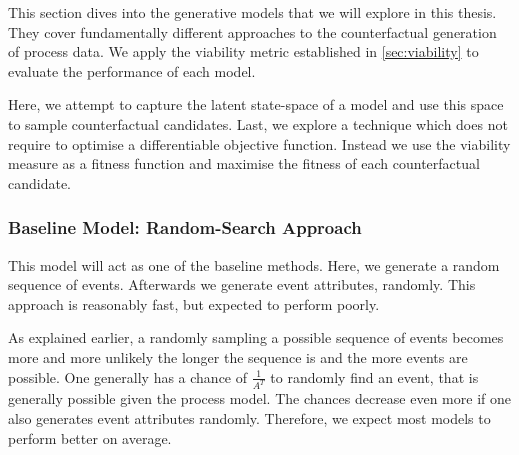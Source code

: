 \documentclass[./../../paper.tex]{subfiles}
\begin{document}
This section dives into the generative models that we will explore in this thesis. They cover fundamentally different approaches to the counterfactual generation of process data. We apply the viability metric established in \autoref{sec:viability} to evaluate the performance of each model.


Here, we attempt to capture the latent state-space of a model and use this space to sample counterfactual candidates.  Last, we explore a technique which does not require to optimise a differentiable objective function. Instead we use the viability measure as a fitness function and maximise the fitness of each counterfactual candidate.



\subsubsection{Baseline Model: Random-Search Approach}
This model will act as one of the baseline methods. Here, we generate a random sequence of events. Afterwards we generate event attributes, randomly. This approach is reasonably fast, but expected to perform poorly.

As explained earlier, a randomly sampling a possible sequence of events becomes more and more unlikely the longer the sequence is and the more events are possible. One generally has a chance of $\frac{1}{A^T}$ to randomly find an event, that is generally possible given the process model. The chances decrease even more if one also generates event attributes randomly. Therefore, we expect most models to perform better on average.
\end{document}
